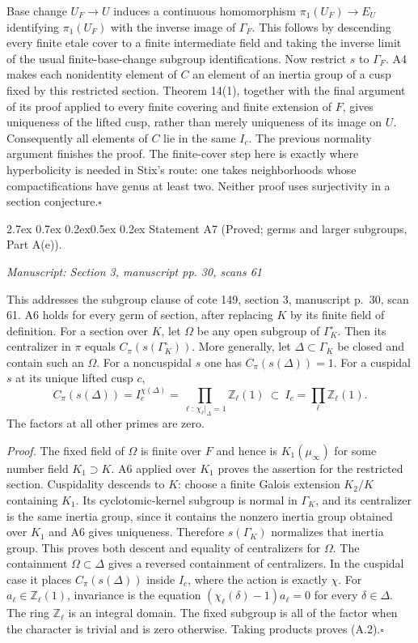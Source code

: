 \documentclass[11pt,a4paper]{article}
\makeatletter
\newcommand{\passage}[1]{\par\smallskip\noindent\textit{Manuscript: #1}\par\smallskip}
\renewcommand\paragraph{\@startsection{paragraph}{4}{\z@}%
  {2.7ex \@plus 0.7ex \@minus 0.2ex}{0.5ex \@plus 0.2ex}%
  {\normalfont\normalsize\bfseries}}
\makeatother
\begin{document}
Base change $U_F\to U$ induces a continuous homomorphism $\pi_1(U_F)\to E_U$ identifying $\pi_1(U_F)$ with the inverse image of $\Gamma_F$. This follows by descending every finite etale cover to a finite intermediate field and taking the inverse limit of the usual finite-base-change subgroup identifications. Now restrict $s$ to $\Gamma_F$. A4 makes each nonidentity element of $C$ an element of an inertia group of a cusp fixed by this restricted section. Theorem 14(1), together with the final argument of its proof applied to every finite covering and finite extension of $F$, gives uniqueness of the lifted cusp, rather than merely uniqueness of its image on $U$. Consequently all elements of $C$ lie in the same $I_c$. The previous normality argument finishes the proof. The finite-cover step here is exactly where hyperbolicity is needed in Stix's route: one takes neighborhoods whose compactifications have genus at least two. Neither proof uses surjectivity in a section conjecture.\hfill$\square$

\paragraph{Statement A7 (Proved; germs and larger subgroups, Part A(e)).}\label{res:A7}
\passage{Section 3, manuscript pp. 30, scans 61}

This addresses the subgroup clause of cote 149, section 3, manuscript p.~30, scan 61.
A6 holds for every germ of section, after replacing $K$ by its finite field of definition. For a section over $K$, let $\Omega$ be any open subgroup of $\Gamma_K^\circ$. Then its centralizer in $\pi$ equals $C_\pi(s(\Gamma_K^\circ))$. More generally, let $\Delta\subset\Gamma_K$ be closed and contain such an $\Omega$. For a noncuspidal $s$ one has $C_\pi(s(\Delta))=1$. For a cuspidal $s$ at its unique lifted cusp $c$,
\[
 C_\pi(s(\Delta))=I_c^{\chi(\Delta)}
 =\prod_{\ell:\,\chi_\ell|_\Delta=1}\mathbb Z_\ell(1)
 \ \subset\ I_c=\prod_\ell\mathbb Z_\ell(1).\tag{A.2}
\]
The factors at all other primes are zero.

\emph{Proof.} The fixed field of $\Omega$ is finite over $F$ and hence is $K_1(\mu_\infty)$ for some number field $K_1\supset K$. A6 applied over $K_1$ proves the assertion for the restricted section. Cuspidality descends to $K$: choose a finite Galois extension $K_2/K$ containing $K_1$. Its cyclotomic-kernel subgroup is normal in $\Gamma_K$, and its centralizer is the same inertia group, since it contains the nonzero inertia group obtained over $K_1$ and A6 gives uniqueness. Therefore $s(\Gamma_K)$ normalizes that inertia group. This proves both descent and equality of centralizers for $\Omega$. The containment $\Omega\subset\Delta$ gives a reversed containment of centralizers. In the cuspidal case it places $C_\pi(s(\Delta))$ inside $I_c$, where the action is exactly $\chi$. For $a_\ell\in\mathbb Z_\ell(1)$, invariance is the equation $(\chi_\ell(\delta)-1)a_\ell=0$ for every $\delta\in\Delta$. The ring $\mathbb Z_\ell$ is an integral domain. The fixed subgroup is all of the factor when the character is trivial and is zero otherwise. Taking products proves (A.2).\hfill$\square$
\end{document}
